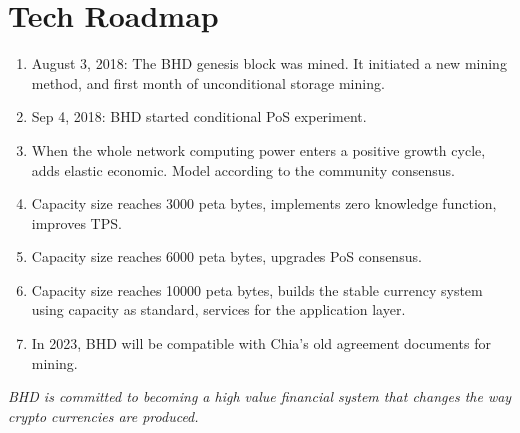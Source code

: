 \chapter{Tech Roadmap}
\begin{enumerate}
    \item August 3, 2018: The BHD genesis block was mined. It initiated a new mining method, and first month of unconditional storage mining.
    \item Sep 4, 2018: BHD started conditional PoS experiment.
    \item When the whole network computing power enters a positive growth cycle, adds elastic economic. Model according to the community consensus.
    \item Capacity size reaches 3000 peta bytes, implements zero knowledge function, improves TPS.
    \item Capacity size reaches 6000 peta bytes, upgrades PoS consensus.
    \item Capacity size reaches 10000 peta bytes, builds the stable currency system using capacity as standard, services for the application layer.
    \item In 2023, BHD will be compatible with Chia's old agreement documents for mining.
\end{enumerate}

\begin{flushleft}
    \textit{BHD is committed to becoming a high value financial system that changes the way crypto currencies are produced.}
\end{flushleft}

